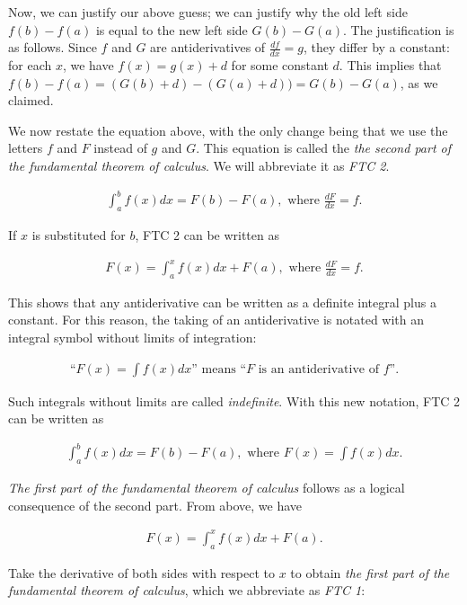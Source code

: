 \documentclass{article}
\begin{document}
Now, we can justify our above guess; we can justify why the old left side $f(b) - f(a)$ is equal to the new left side $G(b) - G(a)$. The justification is as follows. Since $f$ and $G$ are antiderivatives of $\frac{df}{dx} = g$, they differ by a constant: for each $x$, we have $f(x) = g(x) + d$ for some constant $d$. This implies that $f(b) - f(a) = (G(b) + d) - (G(a) + d)) = G(b) - G(a)$, as we claimed.

We now restate the equation above, with the only change being that we use the letters $f$ and $F$ instead of $g$ and $G$. This equation is called the \textit{the second part of the fundamental theorem of calculus}. We will abbreviate it as \textit{FTC 2}.

\begin{align*}
    \int_a^b f(x) dx = F(b) - F(a), \text{ where $\frac{dF}{dx} = f$}.
\end{align*}

If $x$ is substituted for $b$, FTC 2 can be written as

\begin{align*}
    F(x) = \int_a^x f(x) dx + F(a), \text{ where $\frac{dF}{dx} = f$}.
\end{align*}

This shows that any antiderivative can be written as a definite integral plus a constant. For this reason, the taking of an antiderivative is notated with an integral symbol without limits of integration:

\begin{align*}
    \text{``$F(x) = \int f(x) dx$'' means ``$F$ is an antiderivative of $f$''}.
\end{align*}

Such integrals without limits are called \textit{indefinite}. With this new notation, FTC 2 can be written as

\begin{align*}
    \int_a^b f(x) dx = F(b) - F(a), \text{ where $F(x) = \int f(x) dx$}.
\end{align*}

\textit{The first part of the fundamental theorem of calculus} follows as a logical consequence of the second part. From above, we have

\begin{align*}
    F(x) = \int_a^x f(x) dx + F(a).
\end{align*}

Take the derivative of both sides with respect to $x$ to obtain \textit{the first part of the fundamental theorem of calculus}, which we abbreviate as \textit{FTC 1}:
\end{document}
